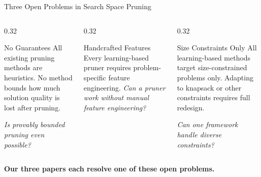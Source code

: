 \documentclass[aspectratio=169,xcolor=dvipsnames,8pt]{beamer}
\begin{document}
\begin{frame}{Three Open Problems in Search Space Pruning}
  \begin{columns}[T]
    \begin{column}{0.32\textwidth}
      \begin{alertblock}{No Guarantees}
        All existing pruning methods are heuristics. No method bounds how much
        solution quality is lost after pruning.

        \vspace{0.3cm}

        \textit{Is provably bounded pruning even possible?}
      \end{alertblock}
    \end{column}
    \begin{column}{0.32\textwidth}
      \begin{alertblock}{ Handcrafted Features}
        Every learning-based pruner requires problem-specific feature engineering.
        \vspace{0.3cm}
        \textit{Can a pruner work without manual feature engineering?}
      \end{alertblock}
    \end{column}
    \begin{column}{0.32\textwidth}
      \begin{alertblock}{\faLock\; Size Constraints Only}
        All learning-based methods target size-constrained problems only.
        Adapting to knapsack or other constraints requires full redesign.

        \vspace{0.3cm}

        \textit{Can one framework handle diverse constraints?}
      \end{alertblock}
    \end{column}
  \end{columns}

  \vspace{0.4cm}
  \centering
  \textbf{Our three papers each resolve one of these open problems.}
\end{frame}
\end{document}
